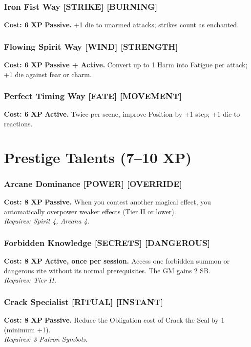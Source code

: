\subsubsection*{Iron Fist Way \textnormal{[STRIKE] [BURNING]}}
\label{talent:iron-fist-way}
\textbf{Cost: 6 XP} \textbf{Passive.} +1 die to unarmed attacks; strikes count as enchanted.

\subsubsection*{Flowing Spirit Way \textnormal{[WIND] [STRENGTH]}}
\label{talent:flowing-spirit-way}
\textbf{Cost: 6 XP} \textbf{Passive + Active.} Convert up to 1 Harm into Fatigue per attack; +1 die against fear or charm.

\subsubsection*{Perfect Timing Way \textnormal{[FATE] [MOVEMENT]}}
\label{talent:perfect-timing-way}
\textbf{Cost: 6 XP} \textbf{Active.} Twice per scene, improve Position by +1 step; +1 die to reactions.

\section{Prestige Talents (7–10 XP)}
\label{sec:prestige-talents}

\subsubsection*{Arcane Dominance \textnormal{[POWER] [OVERRIDE]}}
\label{talent:arcane-dominance}
\textbf{Cost: 8 XP} \textbf{Passive.} When you contest another magical effect, you automatically overpower weaker effects (Tier II or lower). \\
\textit{Requires: Spirit 4, Arcana 4.}

\subsubsection*{Forbidden Knowledge \textnormal{[SECRETS] [DANGEROUS]}}
\label{talent:forbidden-knowledge}
\textbf{Cost: 8 XP} \textbf{Active, once per session.} Access one forbidden summon or dangerous rite without its normal prerequisites. The GM gains 2 SB. \\
\textit{Requires: Tier II.}

\subsubsection*{Crack Specialist \textnormal{[RITUAL] [INSTANT]}}
\label{talent:crack-specialist}
\textbf{Cost: 8 XP} \textbf{Passive.} Reduce the Obligation cost of Crack the Seal by 1 (minimum +1). \\
\textit{Requires: 3 Patron Symbols.}

